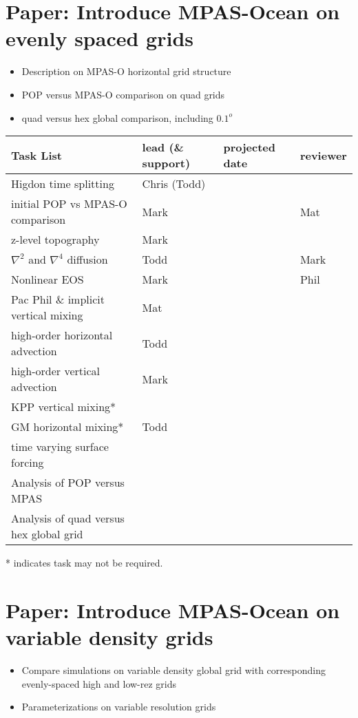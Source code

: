 \section{Paper: Introduce MPAS-Ocean on evenly spaced grids}
\begin{itemize}
\item{Description on MPAS-O horizontal grid structure}
\item{POP versus MPAS-O comparison on quad grids}
\item{quad versus hex global comparison, including $0.1^o$}
\end{itemize}

\begin{tabular}{| l || l | l | l |}
\hline		
{\bf Task List} \hspace{1.8in} & {\bf lead (\& support)} \hspace{0.1in} & {\bf projected date} & {\bf reviewer } \\
\hline		
Higdon time splitting & Chris (Todd) &  & \\ \hline
initial POP vs MPAS-O comparison & Mark &  & Mat \\ \hline
z-level topography  & Mark &  & \\ \hline
$\nabla^2$ and $\nabla^4$ diffusion & Todd &  & Mark \\ \hline
Nonlinear EOS & Mark &  & Phil \\ \hline
Pac Phil \& implicit vertical mixing & Mat &  & \\ \hline
high-order horizontal advection & Todd &  & \\ \hline
high-order vertical advection & Mark &  & \\ \hline
KPP vertical mixing* &  &  & \\ \hline
GM horizontal mixing* & Todd &  & \\ \hline
time varying surface forcing & & & \\ \hline
Analysis of POP versus MPAS &  &  & \\ \hline
Analysis of quad versus hex global grid &  &  & \\ \hline
\end{tabular}
* indicates task may not be required.
\\

\section{Paper: Introduce MPAS-Ocean on variable density grids}
\begin{itemize}
\item{Compare simulations on variable density global grid with corresponding evenly-spaced high and low-rez grids}
\item{Parameterizations on variable resolution grids}
\end{itemize}

